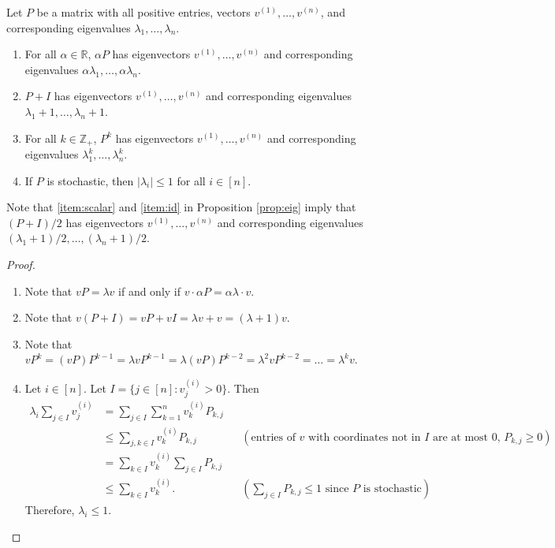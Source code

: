 \documentclass[letterpaper, reqno,11pt]{article}
\newcommand{\RR}{\mathbb{R}}
\newcommand{\ZZ}{\mathbb{Z}}
\begin{document}
\begin{proposition} \label{prop:eig}
  Let $P$ be a matrix with all positive entries, vectors $v^{(1)}, \ldots, v^{(n)}$, and corresponding eigenvalues $\lambda_1, \ldots, \lambda_n$.
  \begin{enumerate}[itemsep=0pt, label=(\roman*)]
    \item \label{item:scalar} For all $\alpha \in \RR$, $\alpha P$ has eigenvectors $v^{(1)}, \ldots, v^{(n)}$ and corresponding eigenvalues $\alpha \lambda_1, \ldots, \alpha \lambda_n$.
    \item \label{item:id} $P + I$ has eigenvectors $v^{(1)}, \ldots, v^{(n)}$ and corresponding eigenvalues $\lambda_1 + 1, \ldots, \lambda_n + 1$.
    \item For all $k \in \ZZ_+$, $P^k$ has eigenvectors $v^{(1)}, \ldots, v^{(n)}$ and corresponding eigenvalues $\lambda_1^k, \ldots, \lambda_n^k$.
    \item If $P$ is stochastic, then $|\lambda_i| \leq 1$ for all $i \in [n]$.
  \end{enumerate}
\end{proposition}

Note that \ref{item:scalar} and \ref{item:id} in Proposition \ref{prop:eig} imply that $(P + I)/2$ has eigenvectors $v^{(1)}, \ldots, v^{(n)}$ and corresponding eigenvalues $(\lambda_1 + 1)/2, \ldots, (\lambda_n + 1)/2$.

\begin{proof}
  \begin{enumerate}[itemsep=0pt, label=(\roman*)]
    \item Note that $vP = \lambda v$ if and only if $v \cdot \alpha P = \alpha \lambda \cdot v$.
    \item Note that $v(P + I) = vP + vI = \lambda v + v = (\lambda + 1)v$.
    \item Note that $vP^k = (vP)P^{k - 1} = \lambda vP^{k - 1} = \lambda (vP)P^{k - 2} = \lambda^2 vP^{k - 2} = \ldots = \lambda^k v$.
    \item Let $i \in [n]$. Let $I = \{ j \in [n] : v_j^{(i)} > 0 \}$. Then
    \begin{align*}
      \lambda_i \sum_{j \in I} v_j^{(i)} &= \sum_{j \in I} \sum_{k = 1}^n v_k^{(i)} P_{k, j} \\
      &\leq \sum_{j, k \in I} v_k^{(i)} P_{k, j} && (\text{entries of $v$ with coordinates not in $I$ are at most $0$, $P_{k, j} \geq 0$}) \\
      &= \sum_{k \in I} v_k^{(i)} \sum_{j \in I} P_{k, j} \\
      &\leq \sum_{k \in I} v_k^{(i)}. && \left(\text{$\sum_{j \in I} P_{k, j} \leq 1$ since $P$ is stochastic}\right)
    \end{align*}
    Therefore, $\lambda_i \leq 1$.
  \end{enumerate}
\end{proof}
\end{document}
